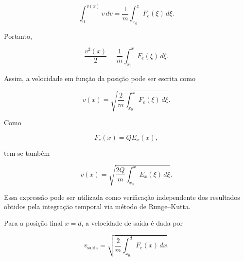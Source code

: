 \documentclass[12pt,a4paper]{article}
\begin{document}
\begin{equation}
\int_0^{v(x)}
v\,dv
=
\frac{1}{m}
\int_{x_0}^{x}
F_e(\xi)\,d\xi.
\end{equation}

Portanto,

\begin{equation}
\frac{v^2(x)}{2}
=
\frac{1}{m}
\int_{x_0}^{x}
F_e(\xi)\,d\xi.
\end{equation}

Assim, a velocidade em função da posição pode ser escrita como

\begin{equation}
\boxed{
v(x)
=
\sqrt{
\frac{2}{m}
\int_{x_0}^{x}
F_e(\xi)\,d\xi
}
}.
\end{equation}

Como

\begin{equation}
F_e(x)
=
Q E_x(x),
\end{equation}

tem-se também

\begin{equation}
\boxed{
v(x)
=
\sqrt{
\frac{2Q}{m}
\int_{x_0}^{x}
E_x(\xi)\,d\xi
}
}.
\end{equation}

Essa expressão pode ser utilizada como verificação independente dos resultados
obtidos pela integração temporal via método de Runge--Kutta.

Para a posição final $x=d$, a velocidade de saída é dada por

\begin{equation}
\boxed{
v_{\mathrm{saida}}
=
\sqrt{
\frac{2}{m}
\int_{x_0}^{d}
F_e(x)\,dx
}
}.
\end{equation}
\end{document}

